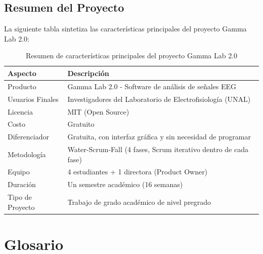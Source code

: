 \documentclass{article}
\begin{document}
\subsection{Resumen del Proyecto}

La siguiente tabla sintetiza las características principales del proyecto Gamma Lab 2.0:

\begin{table}[H]
    \centering
    \begin{tabular}{|p{4cm}|p{9cm}|}
        \hline
        \textbf{Aspecto} & \textbf{Descripción} \\
        \hline
        Producto & Gamma Lab 2.0 - Software de análisis de señales EEG \\
        \hline
        Usuarios Finales & Investigadores del Laboratorio de Electrofisiología (UNAL) \\
        \hline
        Licencia & MIT (Open Source) \\
        \hline
        Costo & Gratuito \\
        \hline
        Diferenciador & Gratuita, con interfaz gráfica y sin necesidad de programar \\
        \hline
        Metodología & Water-Scrum-Fall (4 fases, Scrum iterativo dentro de cada fase) \\
        \hline
        Equipo & 4 estudiantes + 1 directora (Product Owner) \\
        \hline
        Duración & Un semestre académico (16 semanas) \\
        \hline
        Tipo de Proyecto & Trabajo de grado académico de nivel pregrado \\
        \hline
    \end{tabular}
    \caption{Resumen de características principales del proyecto Gamma Lab 2.0}
    \label{tab:resumen_proyecto}
\end{table}

\section{Glosario}
\end{document}
